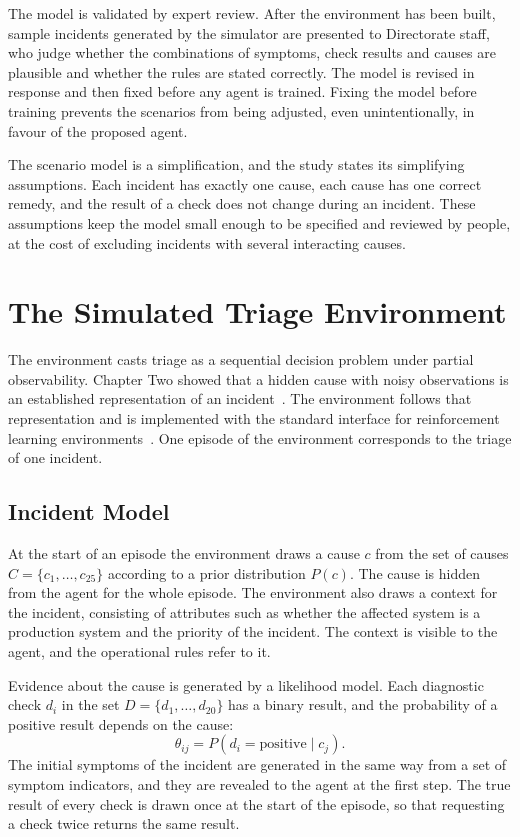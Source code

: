 \documentclass[12pt,a4paper]{article}
\begin{document}
The model is validated by expert review. After the environment has been built, sample incidents generated by the simulator are presented to Directorate staff, who judge whether the combinations of symptoms, check results and causes are plausible and whether the rules are stated correctly. The model is revised in response and then fixed before any agent is trained. Fixing the model before training prevents the scenarios from being adjusted, even unintentionally, in favour of the proposed agent.

The scenario model is a simplification, and the study states its simplifying assumptions. Each incident has exactly one cause, each cause has one correct remedy, and the result of a check does not change during an incident. These assumptions keep the model small enough to be specified and reviewed by people, at the cost of excluding incidents with several interacting causes.

\section{The Simulated Triage Environment}
\label{sec:environment}

The environment casts triage as a sequential decision problem under partial observability. Chapter Two showed that a hidden cause with noisy observations is an established representation of an incident~\cite{kaelbling1998,kim2025,hammar2026belief}. The environment follows that representation and is implemented with the standard interface for reinforcement learning environments~\cite{towers2024}. One episode of the environment corresponds to the triage of one incident.

\subsection{Incident Model}

At the start of an episode the environment draws a cause $c$ from the set of causes $C = \{c_1, \dots, c_{25}\}$ according to a prior distribution $P(c)$. The cause is hidden from the agent for the whole episode. The environment also draws a context for the incident, consisting of attributes such as whether the affected system is a production system and the priority of the incident. The context is visible to the agent, and the operational rules refer to it.

Evidence about the cause is generated by a likelihood model. Each diagnostic check $d_i$ in the set $D = \{d_1, \dots, d_{20}\}$ has a binary result, and the probability of a positive result depends on the cause:
\begin{equation}
\theta_{ij} = P(d_i = \text{positive} \mid c_j).
\label{eq:likelihood}
\end{equation}
The initial symptoms of the incident are generated in the same way from a set of symptom indicators, and they are revealed to the agent at the first step. The true result of every check is drawn once at the start of the episode, so that requesting a check twice returns the same result.
\end{document}
